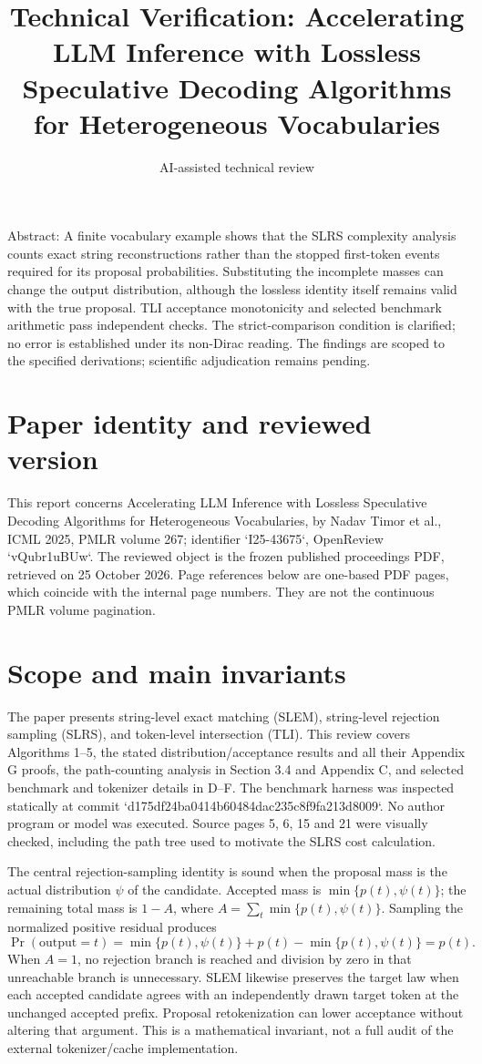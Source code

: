 \documentclass[10pt]{article}
\title{Technical Verification: Accelerating LLM Inference with Lossless Speculative Decoding Algorithms for Heterogeneous Vocabularies}
\author{AI-assisted technical review}
\date{}
\begin{document}
\maketitle
Abstract: A finite vocabulary example shows that the SLRS complexity analysis counts exact string reconstructions rather than the stopped first-token events required for its proposal probabilities. Substituting the incomplete masses can change the output distribution, although the lossless identity itself remains valid with the true proposal. TLI acceptance monotonicity and selected benchmark arithmetic pass independent checks. The strict-comparison condition is clarified; no error is established under its non-Dirac reading. The findings are scoped to the specified derivations; scientific adjudication remains pending.\par
\section*{Paper identity and reviewed version}
This report concerns Accelerating LLM Inference with Lossless Speculative Decoding Algorithms for Heterogeneous Vocabularies, by Nadav Timor et al., ICML 2025, PMLR volume 267; identifier `I25-43675`, OpenReview `vQubr1uBUw`. The reviewed object is the frozen published proceedings PDF, retrieved on 25 October 2026. Page references below are one-based PDF pages, which coincide with the internal page numbers. They are not the continuous PMLR volume pagination.\par
\section*{Scope and main invariants}
The paper presents string-level exact matching (SLEM), string-level rejection sampling (SLRS), and token-level intersection (TLI). This review covers Algorithms 1–5, the stated distribution/acceptance results and all their Appendix G proofs, the path-counting analysis in Section 3.4 and Appendix C, and selected benchmark and tokenizer details in D–F. The benchmark harness was inspected statically at commit `d175df24ba0414b60484dac235c8f9fa213d8009`. No author program or model was executed. Source pages 5, 6, 15 and 21 were visually checked, including the path tree used to motivate the SLRS cost calculation.\par
The central rejection-sampling identity is sound when the proposal mass is the actual distribution \(\psi\) of the candidate. Accepted mass is \(\min\{p(t),\psi(t)\}\); the remaining total mass is \(1-A\), where \(A=\sum_t\min\{p(t),\psi(t)\}\). Sampling the normalized positive residual produces \[\Pr(\mathrm{output}=t)=\min\{p(t),\psi(t)\}+p(t)-\min\{p(t),\psi(t)\}=p(t).\] When \(A=1\), no rejection branch is reached and division by zero in that unreachable branch is unnecessary. SLEM likewise preserves the target law when each accepted candidate agrees with an independently drawn target token at the unchanged accepted prefix. Proposal retokenization can lower acceptance without altering that argument. This is a mathematical invariant, not a full audit of the external tokenizer/cache implementation.\par
\end{document}
